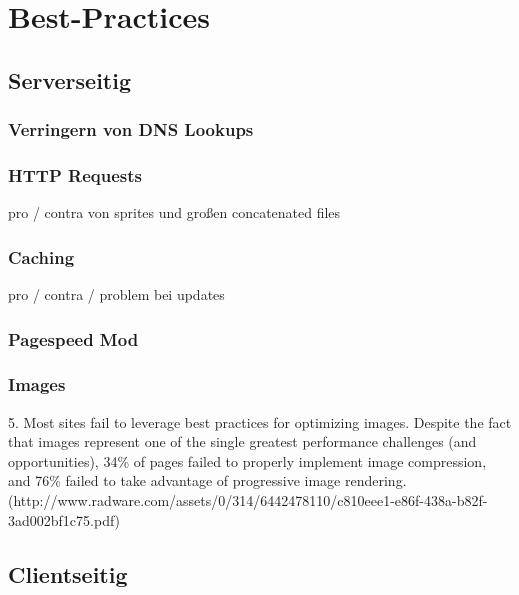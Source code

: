 \section{Best-Practices} %
\label{sec:best_practices}

	\subsection{Serverseitig}
	\label{sub:serverseitig}

		\subsubsection{Verringern von DNS Lookups} %
		\label{ssub:verringern_von_dns_lookups}
		

		\subsubsection{HTTP Requests} %
		\label{ssub:http_requests}
		pro / contra von sprites und großen concatenated files

		\subsubsection{Caching} %
		\label{ssub:caching}
		pro / contra / problem bei updates

		\subsubsection{Pagespeed Mod} %
		\label{ssub:pagespeed_mod}
		

		\subsubsection{Images} %
		\label{ssub:images}
		5. Most sites fail to leverage best practices for optimizing images.
		Despite the fact that images represent one of the single greatest performance challenges (and opportunities),
		34\% of pages failed to properly implement image compression, and 76\% failed to take advantage of progressive
		image rendering. (http://www.radware.com/assets/0/314/6442478110/c810eee1-e86f-438a-b82f-3ad002bf1c75.pdf)




	\subsection{Clientseitig}
	\label{sub:clientseitig}
	

